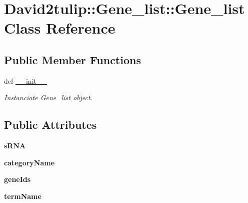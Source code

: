 \hypertarget{classDavid2tulip_1_1Gene__list_1_1Gene__list}{
\section{\-David2tulip\-:\-:\-Gene\-\_\-list\-:\-:\-Gene\-\_\-list \-Class \-Reference}
\label{classDavid2tulip_1_1Gene__list_1_1Gene__list}
}
\subsection*{\-Public \-Member \-Functions}
\begin{DoxyCompactItemize}
\item 
def \hyperlink{classDavid2tulip_1_1Gene__list_1_1Gene__list_a4fcdd30c062d54bec6f3b4d7e69aa63b}{\-\_\-\-\_\-init\-\_\-\-\_\-}
\begin{DoxyCompactList}\small\item\em \-Instanciate \hyperlink{classDavid2tulip_1_1Gene__list_1_1Gene__list}{\-Gene\-\_\-list} object. \end{DoxyCompactList}\end{DoxyCompactItemize}
\subsection*{\-Public \-Attributes}
\begin{DoxyCompactItemize}
\item 
\hypertarget{classDavid2tulip_1_1Gene__list_1_1Gene__list_ae1e8423d5da16187686159593401a126}{
{\bfseries s\-R\-N\-A}}
\label{classDavid2tulip_1_1Gene__list_1_1Gene__list_ae1e8423d5da16187686159593401a126}

\item 
\hypertarget{classDavid2tulip_1_1Gene__list_1_1Gene__list_a19e62a6c65bdd24bb6b22154c9034b5d}{
{\bfseries category\-Name}}
\label{classDavid2tulip_1_1Gene__list_1_1Gene__list_a19e62a6c65bdd24bb6b22154c9034b5d}

\item 
\hypertarget{classDavid2tulip_1_1Gene__list_1_1Gene__list_ae3c301b61039281f8af284bc8816993a}{
{\bfseries gene\-Ids}}
\label{classDavid2tulip_1_1Gene__list_1_1Gene__list_ae3c301b61039281f8af284bc8816993a}

\item 
\hypertarget{classDavid2tulip_1_1Gene__list_1_1Gene__list_a48dd85498e5daf9020cf23441282598a}{
{\bfseries term\-Name}}
\label{classDavid2tulip_1_1Gene__list_1_1Gene__list_a48dd85498e5daf9020cf23441282598a}

\end{DoxyCompactItemize}


